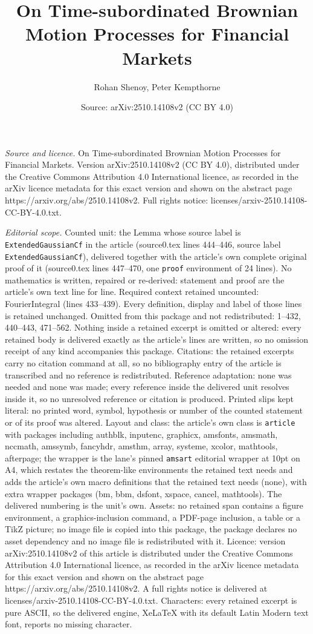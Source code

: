 \documentclass[10pt,a4paper]{amsart}
\title[On Time-subordinated Brownian Motion Processes for Financial]{On Time-subordinated Brownian Motion Processes for Financial Markets}
\author{Rohan Shenoy, Peter Kempthorne}
\date{Source: arXiv:2510.14108v2 (CC BY 4.0)}
\begin{document}
\maketitle

\noindent\emph{Source and licence.} On Time-subordinated Brownian Motion Processes for Financial Markets. Version arXiv:2510.14108v2 (CC BY 4.0), distributed under the Creative Commons Attribution 4.0 International licence, as recorded in the arXiv licence metadata for this exact version and shown on the abstract page https://arxiv.org/abs/2510.14108v2. Full rights notice: licenses/arxiv-2510.14108-CC-BY-4.0.txt.\par\smallskip

\noindent\textit{Editorial scope.} Counted unit: the Lemma whose source label is \texttt{ExtendedGaussianCf} in the article (source0.tex lines 444--446, source label \texttt{ExtendedGaussianCf}), delivered together with the article's own complete original proof of it (source0.tex lines 447--470, one \texttt{proof} environment of 24 lines). No mathematics is written, repaired or re-derived: statement and proof are the article's own text line for line. Required context retained uncounted: FourierIntegral (lines 433--439). Every definition, display and label of those lines is retained unchanged. Omitted from this package and not redistributed: 1--432, 440--443, 471--562. Nothing inside a retained excerpt is omitted or altered: every retained body is delivered exactly as the article's lines are written, so no omission receipt of any kind accompanies this package. Citations: the retained excerpts carry no citation command at all, so no bibliography entry of the article is transcribed and no reference is redistributed. Reference adaptation: none was needed and none was made; every reference inside the delivered unit resolves inside it, so no unresolved reference or citation is produced. Printed slips kept literal: no printed word, symbol, hypothesis or number of the counted statement or of its proof was altered. Layout and class: the article's own class is \texttt{article} with packages including authblk, inputenc, graphicx, amsfonts, amsmath, nccmath, amssymb, fancyhdr, amsthm, array, systeme, xcolor, mathtools, afterpage; the wrapper is the lane's pinned \texttt{amsart} editorial wrapper at 10pt on A4, which restates the theorem-like environments the retained text needs and adds the article's own macro definitions that the retained text needs (none), with extra wrapper packages (bm, bbm, dsfont, xspace, cancel, mathtools). The delivered numbering is the unit's own. Assets: no retained span contains a figure environment, a graphics-inclusion command, a PDF-page inclusion, a table or a TikZ picture; no image file is copied into this package, the package declares no asset dependency and no image file is redistributed with it. Licence: version arXiv:2510.14108v2 of this article is distributed under the Creative Commons Attribution 4.0 International licence, as recorded in the arXiv licence metadata for this exact version and shown on the abstract page https://arxiv.org/abs/2510.14108v2. A full rights notice is delivered at licenses/arxiv-2510.14108-CC-BY-4.0.txt. Characters: every retained excerpt is pure ASCII, so the delivered engine, XeLaTeX with its default Latin Modern text font, reports no missing character.
\end{document}

